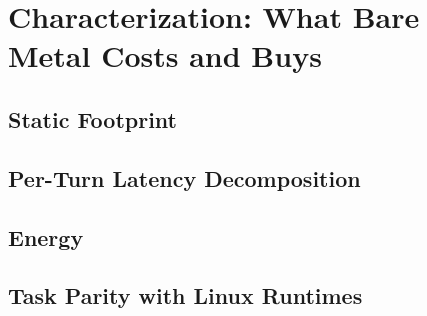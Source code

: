 \chapter{Characterization: What Bare Metal Costs and Buys}
\label{ch:characterization}

\section{Static Footprint}
\label{sec:char-footprint}

\section{Per-Turn Latency Decomposition}
\label{sec:char-latency}

\section{Energy}
\label{sec:char-energy}

\section{Task Parity with Linux Runtimes}
\label{sec:char-parity}

